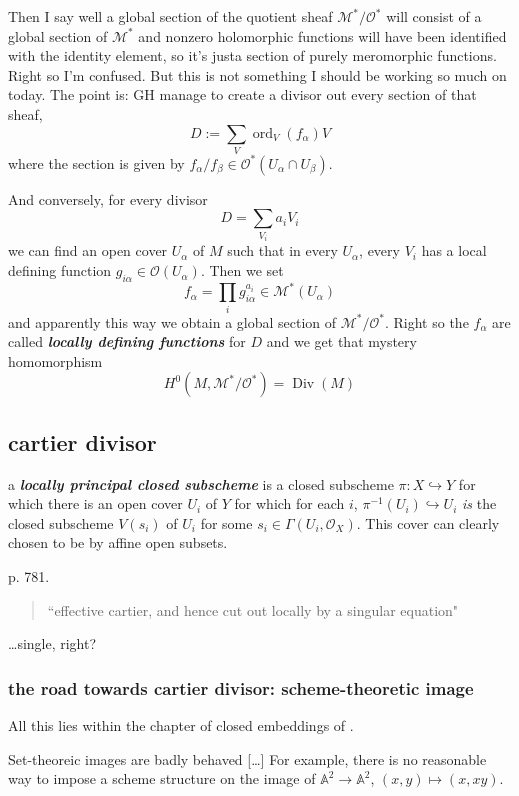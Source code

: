Then I say well a global section of the quotient sheaf \(\mathcal{M}^*/\mathcal{O}^*\) will consist of a global section of \(\mathcal{M}^*\) and nonzero holomorphic functions will have been identified with the identity element, so it's justa  section of purely meromorphic functions. Right so I'm confused. But this is not something I should be working so much on today. The point is: GH manage to create a divisor out every section of that sheaf,
\[D:=\sum_V \operatorname{ord}_V(f_\alpha)V\]
where the section is given by  \(f_\alpha/f_\beta \in \mathcal{O}^*(U_\alpha \cap U_\beta)\).

And conversely, for every divisor
\[D=\sum_{V_i}a_iV_i\]
we can find an open cover \(U_\alpha\) of \(M\) such that in every \(U_\alpha\), every \(V_i\) has a local defining function \(g_{i\alpha}\in \mathcal{O}(U_\alpha)\). Then we set
\[f_\alpha=\prod_{i}g_{i\alpha}^{a_i}\in \mathcal{M}^*(U_\alpha)\]
and apparently this way we obtain a global section of \(\mathcal{M}^*/\mathcal{O}^*\). Right so the \(f_\alpha\) are called \textit{\textbf{locally defining functions}} for \(D\) and we get that mystery homomorphism
 \[H^{0}(M,\mathcal{M}^*/\mathcal{O}^*)=\operatorname{Div}(M)\]

\subsection{cartier divisor}

a \textit{\textbf{locally principal closed subscheme}} is a closed subscheme \(\pi:X \hookrightarrow  Y\) for which there is an open cover \(U_i\) of \(Y\) for which for each \(i\), \(\pi^{-1}(U_i) \hookrightarrow U_i\) \textit{is} the closed subscheme \(V(s_i)\) of \(U_i\) for some \(s_i \in \Gamma(U_i,\mathcal{O}_X)\). This cover can clearly chosen to be by affine open subsets.

\cite{sea} p. 781.
\begin{quotation}
``effective cartier, and hence cut out locally by a singular equation"
\end{quotation}
…single, right?

\subsubsection{the road towards cartier divisor: scheme-theoretic image}

All this lies within the chapter of closed embeddings of \cite{sea}.

Set-theoreic images are badly behaved […] For example, there is no reasonable way to impose a scheme structure on the image of \(\mathbb{A}^2 \to \mathbb{A}^2\), \((x,y)\mapsto (x,xy)\).

